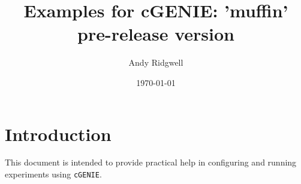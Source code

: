 \documentclass[10pt,twoside]{article}
\title{Examples for cGENIE: 'muffin' pre-release version}
\author{Andy Ridgwell}
\date{\today}
\begin{document}

\maketitle


\tableofcontents



\newpage
\section{Introduction}\label{Introduction}

This document is intended to provide practical help in configuring and running experiments using \texttt{cGENIE}.
\end{document}
